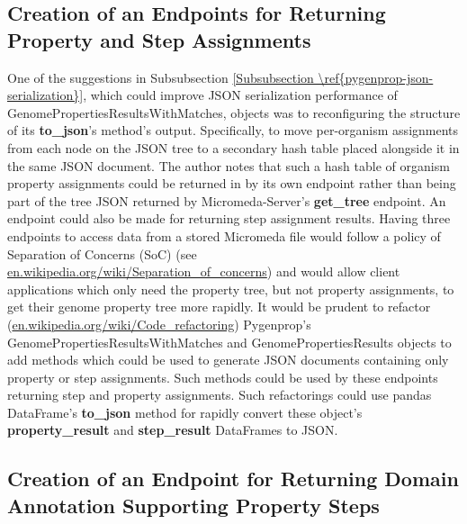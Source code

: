 \subsection{Creation of an Endpoints for Returning Property and Step Assignments}

One of the suggestions in Subsubsection \ref{Subsubsection \ref{pygenprop-json-serialization}}, which could improve JSON serialization performance of GenomePropertiesResultsWithMatches, objects was to reconfiguring the structure of its \textbf{to\_json}'s method's output. Specifically, to move per-organism assignments from each node on the JSON tree to a secondary hash table placed alongside it in the same JSON document. The author notes that such a hash table of organism property assignments could be returned in by its own endpoint rather than being part of the tree JSON returned by Micromeda-Server's \textbf{get_tree} endpoint. An endpoint could also be made for returning step assignment results. Having three endpoints to access data from a stored Micromeda file would follow a policy of Separation of Concerns (SoC) (see \href{en.wikipedia.org/wiki/Separation\_of\_concerns}{en.wikipedia.org/wiki/Separation\_of\_concerns}) and would allow client applications which only need the property tree, but not property assignments, to get their genome property tree more rapidly. It would be prudent to refactor (\href{en.wikipedia.org/wiki/Code\_refactoring}{en.wikipedia.org/wiki/Code\_refactoring}) Pygenprop's GenomePropertiesResultsWithMatches and GenomePropertiesResults objects to add methods which could be used to generate JSON documents containing only property or step assignments. Such methods could be used by these endpoints returning step and property assignments. Such refactorings could use pandas DataFrame's \textbf{to_json} method for rapidly convert these object's \textbf{property_result} and \textbf{step_result} DataFrames to JSON.

\subsection{Creation of an Endpoint for Returning Domain Annotation Supporting Property Steps}

